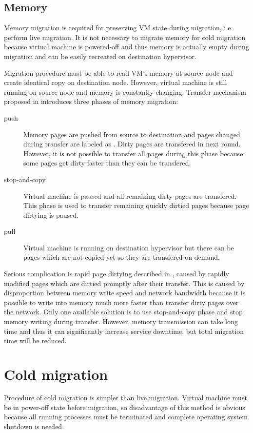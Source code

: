 \subsection{Memory}
Memory migration is required for preserving \Ac{VM} state during migration, i.e. perform live migration. It is not necessary to migrate memory for cold migration because virtual machine is powered-off and thus memory is actually empty during migration and can be easily recreated on destination hypervisor. 

Migration procedure must be able to read \Ac{VM}'s memory at source node and create identical copy on destination node. However, virtual machine is still running on source node and memory is constantly changing. Transfer mechanism proposed in \cite{live-migration-of-vms} introduces three phases of memory migration:
\begin{description}
	\item[push] Memory pages are pushed from source to destination and pages changed during transfer are labeled as . Dirty pages are transfered in next round. However, it is not possible to transfer all pages during this phase because some pages get dirty faster than they can be transfered.
	\item[stop-and-copy] Virtual machine is paused and all remaining dirty pages are transfered. This phase is used to transfer remaining quickly dirtied pages because page dirtying is paused.
	\item[pull] Virtual machine is running on destination hypervisor but there can be pages which are not copied yet so they are transfered on-demand.
\end{description}

Serious complication is rapid page dirtying described in \cite{live-migration-of-vms}, caused by rapidly modified pages which are dirtied promptly after their transfer. This is caused by disproportion between memory write speed and network bandwidth because it is possible to write into memory much more faster than transfer dirty pages over the network. Only one available solution is to use stop-and-copy phase and stop memory writing during transfer. However, memory transmission can take long time and thus it can significantly increase service downtime, but total migration time will be reduced.

\section{Cold migration}
Procedure of cold migration is simpler than live migration. Virtual machine must be in power-off state before migration, so disadvantage of this method is obvious because all running processes must be terminated and complete operating system shutdown is needed.

